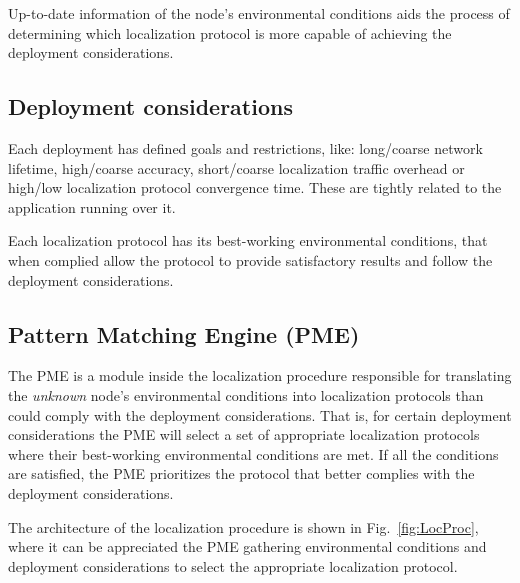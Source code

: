 Up-to-date information of the node's environmental conditions aids the process of determining which localization protocol is more capable of achieving the deployment considerations.

\subsection{Deployment considerations}\label{deploymentConsiderations}
Each deployment has defined goals and restrictions, like: long/coarse network lifetime, high/coarse accuracy, short/coarse localization traffic overhead or high/low localization protocol convergence time. These are tightly related to the application running over it.

Each localization protocol has its best-working environmental conditions, that when complied allow the protocol to provide satisfactory results and follow the deployment considerations.

\subsection{Pattern Matching Engine (PME)}\label{PME}
The PME is a module inside the localization procedure responsible for translating the \emph{unknown} node's environmental conditions into localization protocols than could comply with the deployment considerations. That is, for certain deployment considerations the PME will select a set of appropriate localization protocols where their best-working environmental conditions are met. If all the conditions are satisfied, the PME prioritizes the protocol that better complies with the deployment considerations. 

The architecture of the localization procedure is shown in Fig.~\ref{fig:LocProc}, where it can be appreciated the PME gathering environmental conditions and deployment considerations to select the appropriate localization protocol.

